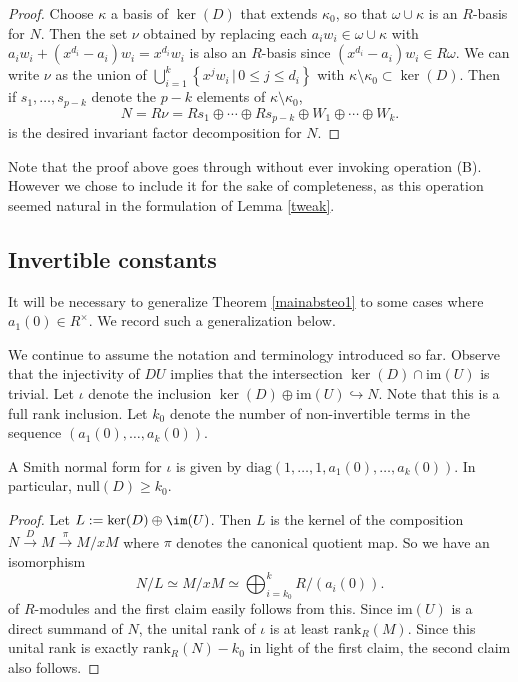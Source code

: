 \begin{proof}
Choose $ \kappa $ a basis of $ \ker(D) $ that extends $ \kappa_{0} $, so that $ \omega  \cup \kappa  $ is an $ R $-basis for $ N $. Then the set $ \nu  $ obtained by replacing each $ a_{i} w_{i} \in \omega \cup \kappa $ with $  a_{i} w_{i} + ( x^{d_{i}}     - a_{i})w_{i}  = x^{d_{i}} w_{i} $ is also an $ R $-basis since $ (x^{d_{i}} - a_{i})   w_{i} \in  R \omega $.  We can write $ \nu  $ as the union of  $ \bigcup_{i=1}^{k} \left \{ x^{j} w_{i} \,  |  \, 0 \leq j \leq d_{i}  \right \} $ with $ \kappa \setminus \kappa_{0} \subset \ker(D)  $. Then if    $ s_{1}, \dots, s_{p -k } $ denote the $  p - k $ elements of $ \kappa \setminus \kappa_{0} $, $$  N = R \nu  =  R s_{1} \oplus \cdots \oplus R s_{p - k } \oplus  W_{1} \oplus \cdots \oplus W_{k}  . %
$$ 
is the desired  invariant factor decomposition for $ N $.   
\end{proof}      
\begin{remark} Note that the proof above goes through without ever invoking operation (B). However we chose to include it for the sake of completeness, as this operation seemed natural in the formulation of Lemma \ref{tweak}.   
\end{remark} 


\subsection{Invertible constants} 

It will be necessary to generalize  Theorem \ref{mainabsteo1} to some cases where $ a_{1}(0) \in R^{\times} $.  We record such a generalization  below.  


  We continue to assume the notation and terminology introduced so far.  Observe that the injectivity of $ DU $ implies that  the intersection $ \ker(D) \cap  \mathrm{im}(U) $ is trivial.  
Let $ \iota $ denote the inclusion $ \ker(D) \oplus \mathrm{im}(U)  \hookrightarrow N $. Note that this is a full rank inclusion. Let  $ k_{0}   $ denote the  number of non-invertible terms in the sequence $ (  a_{1}(0) , \ldots,  a_{k}(0)) $.   
\begin{lemma} \label{smithofD}   A Smith normal form for $ \iota $ is given  by   $  \mathrm{diag}(1,\ldots,1, a_{1}(0), \ldots,  a_{k}(0)) $. In particular, $ \mathrm{null}(D)  \geq  k_{0}    $. \end{lemma}    
\begin{proof}      Let $ L : =  \ker(D) \oplus \im(U  )$. Then $ L $ is the kernel of  the composition  $   N   \xrightarrow{D }  M  \xrightarrow{\, \pi  \, }   M / x M  $ 
where $ \pi $ denotes the canonical quotient map. So we have an isomorphism $$ N /  L  \simeq  M / x M  \simeq \bigoplus _{ i  = k_{0} } ^   {  k  }   R/(a_{i}(0)).  $$
of $ R $-modules and the  first claim easily follows from this.   Since  $ \mathrm{im}(U) $ is a  direct   summand of $ N $, the unital rank of $ \iota $ is at least $ \mathrm{rank}_{R}(M) $. Since this  unital rank 
is  exactly   $ \mathrm{rank}_{R} (N )  -  k_{0}    $ in light of  the first claim,  the second  claim also  follows.    
\end{proof}  

